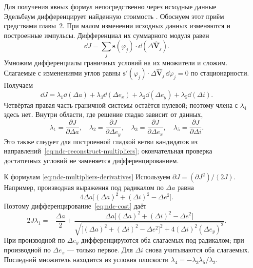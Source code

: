 Для получения явных формул непосредственно через исходные данные
Эдельбаум дифференцирует найденную стоимость
\cite[с.~47, 52--53]{edelbaum}. Обоснуем этот приём средствами
главы~2. При малом изменении исходных данных изменяются и
построенные импульсы. Дифференциал их суммарного модуля равен
\[
 \dd J=\sum_j\boldsymbol s(\varphi_j)\cdot
                   \dd(\Delta\widehat{\boldsymbol V}_j).
\]
Умножим дифференциалы граничных условий на их множители и сложим.
Слагаемые с изменениями углов равны
$\boldsymbol s'(\varphi_j)\cdot\Delta\widehat{\boldsymbol V}_j
\,\dd\varphi_j=0$ по стационарности. Получаем
\[
 \dd J=\lambda_1\dd(\Delta a)+\lambda_3\dd(\Delta e_x)
       +\lambda_2\dd(\Delta e_y)+\lambda_5\dd(\Delta i).
\]
Четвёртая правая часть граничной системы остаётся нулевой;
поэтому члена с $\lambda_4$ здесь нет. Внутри области, где
решение гладко зависит от данных,
\begin{equation}
 \lambda_1=\frac{\partial J}{\partial\Delta a},\quad
 \lambda_2=\frac{\partial J}{\partial\Delta e_y},\quad
 \lambda_3=\frac{\partial J}{\partial\Delta e_x},\quad
 \lambda_5=\frac{\partial J}{\partial\Delta i}.
 \label{eq:ndc-multipliers-derivatives}
\end{equation}
Это также следует для построенной гладкой ветви кандидатов
из направлений~\eqref{eq:ndc-reconstruct-multipliers}; окончательная
проверка достаточных условий не заменяется дифференцированием.

\begin{explanation}{К формулам \eqref{eq:ndc-multipliers-derivatives}}
Используем $\partial J=(\partial J^2)/(2J)$.
Например, производная выражения под радикалом по $\Delta a$ равна
\[
 4\Delta a\bigl[(\Delta a)^2+(\Delta i)^2-\Delta e^2\bigr].
\]
Поэтому дифференцирование~\eqref{eq:ndc-cost} даёт
\[
 2J\lambda_1=-\frac{\Delta a}{2}
 +\frac{\Delta a\bigl[(\Delta a)^2+(\Delta i)^2-\Delta e^2\bigr]}
 {\sqrt{\bigl[(\Delta a)^2+(\Delta i)^2-\Delta e^2\bigr]^2
                      +4(\Delta i)^2(\Delta e_y)^2}}.
\]
При производной по $\Delta e_y$ дифференцируются оба слагаемых
под радикалом; при производной по $\Delta e_x$ --- только первое.
Для $\Delta i$ снова учитываются оба слагаемых.
Последний множитель находится из условия плоскости
$\lambda_4=-\lambda_3\lambda_5/\lambda_2$.
\end{explanation}

